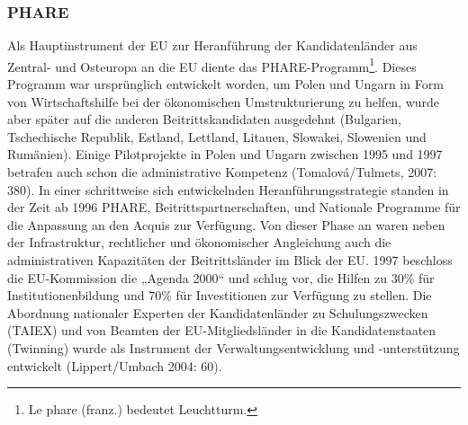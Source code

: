\subsubsection{PHARE}
Als Hauptinstrument der EU zur Heranführung der Kandidatenländer aus Zentral- und Osteuropa an die EU diente das PHARE-Programm\footnote{Le phare (franz.) bedeutet Leuchtturm.}. Dieses Programm war ursprünglich entwickelt worden, um Polen und Ungarn in Form von Wirtschaftshilfe bei der ökonomischen Umstrukturierung zu helfen, wurde aber später auf die anderen Beitrittskandidaten ausgedehnt (Bulgarien, Tschechische Republik, Estland, Lettland, Litauen, Slowakei, Slowenien und Rumänien). Einige Pilotprojekte in Polen und Ungarn zwischen 1995 und 1997 betrafen auch schon die administrative Kompetenz (Tomalová/Tulmets, 2007: 380). In einer schrittweise sich entwickelnden Heranführungsstrategie standen in der Zeit ab 1996 PHARE, Beitrittspartnerschaften, und Nationale Programme für die Anpassung an den Acquis zur Verfügung. Von dieser Phase an waren neben der Infrastruktur, rechtlicher und ökonomischer Angleichung auch die administrativen Kapazitäten der Beitrittsländer im Blick der EU. 1997 beschloss die EU-Kommission die „Agenda 2000“ und schlug vor, die Hilfen zu 30\% für Institutionenbildung und 70\% für Investitionen zur Verfügung zu stellen. Die Abordnung nationaler Experten der Kandidatenländer zu Schulungszwecken (TAIEX) und von Beamten der EU-Mitgliedsländer in die Kandidatenstaaten (Twinning) wurde als Instrument der Verwaltungsentwicklung und -unterstützung entwickelt (Lippert/Umbach 2004: 60).\par

